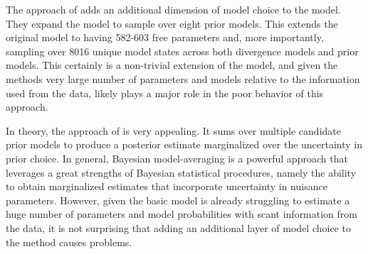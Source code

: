 \documentclass[letterpaper,12pt]{article}
\begin{document}
\begin{linenumbers}
The approach of \citet{Hickerson2013} adds an additional dimension of model
choice to the model. They expand the model to sample over eight prior models.
This extends the original model to having 582-603 free parameters and, more
importantly, sampling over 8016 unique model states across both divergence
models and prior models.
This certainly is a non-trivial extension of the model, and given the methods
very large number of parameters and models relative to the information
used from the data, likely plays a major role in the poor behavior of this
approach.

In theory, the approach of \citet{Hickerson2013} is very appealing.  It sums
over multiple candidate prior models to produce a posterior estimate
marginalized over the uncertainty in prior choice.
In general, Bayesian model-averaging is a powerful approach that leverages a
great strengths of Bayesian statistical procedures, namely the ability to
obtain marginalized estimates that incorporate uncertainty in nuisance
parameters.
However, given the basic \msb model is already struggling to estimate
a huge number of parameters and model probabilities with scant information
from the data, it is not surprising that adding an additional layer of
model choice to the method causes problems.


\end{linenumbers}
\end{document}
